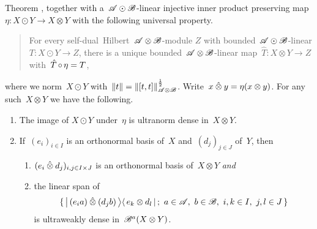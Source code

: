 \begin{parsec}
\begin{point}{Theorem}
    ,
    together with a~$\mathscr{A} \odot \mathscr{B}$-linear injective
    inner product preserving map~$\eta \colon X \odot Y \to X\otimes Y$
    with the following universal property.
    \begin{quote}
    For every self-dual~Hilbert~$\mathscr{A}\otimes\mathscr{B}$-module
    $Z$ with bounded~$\mathscr{A} \odot \mathscr{B}$-linear
        $T\colon X \odot Y \to Z$,
    there is a unique bounded~$\mathscr{A} \otimes \mathscr{B}$-linear
        map~$\hat{T}\colon X \otimes Y \to Z$
    with~$\hat{T} \mathop{\circ} \eta= T$,
    \end{quote}
where we norm~$X \odot Y$ with~$\|t \| = \|[t,t]\|^{\frac{1}{2}}_{\mathscr{A}\otimes \mathscr{B}}$.
Write~$x \mathbin{\hat{\otimes}} y = \eta(x\otimes y)$.
For any such~$X \otimes Y$ we have the following.
\begin{enumerate}
    \item The image of $X \odot Y$ under~$\eta$ is ultranorm dense in~$X \otimes Y$.
    \item If~$(e_i)_{i \in I}$ is an orthonormal basis of~$X$
                and~$(d_j)_{j \in J}$ of~$Y$,
                then
        \begin{enumerate}
            \item $(e_i \mathbin{\hat{\otimes}} d_j)_{i,j\in I\times J}$
                is an orthonormal basis of~$X \otimes Y$ \emph{and}
            \item
                the linear span of
                \begin{equation*}
                    \{\, \ketbra{\,(e_i a) \hotimes (d_j b) \,}{\,
                        e_{k}\otimes d_{l} \,}; \ 
                        a \in \scrA, \ 
                        b \in \scrB,\ 
                        i,k \in I,\ 
                        j,l \in J \,
                    \} 
                \end{equation*}
                is ultraweakly dense in~$\mathscr{B}^a(X \otimes Y)$.
        \end{enumerate}
                

\end{enumerate}
\end{point}
\end{parsec}
